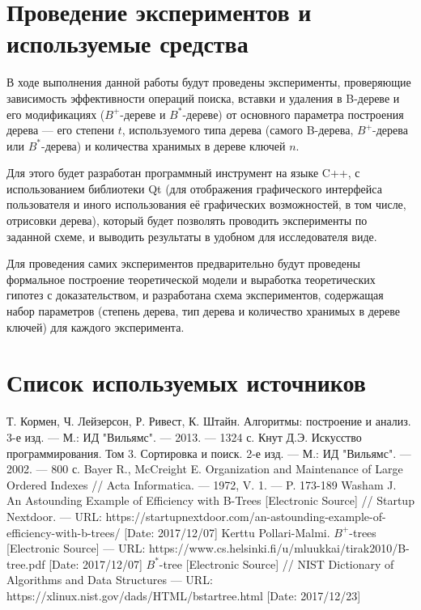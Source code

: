 \documentclass[a4paper,12pt]{article}
\begin{document}
	\section{Проведение экспериментов и используемые средства}
	
	В ходе выполнения данной работы будут проведены эксперименты, проверяющие зависимость эффективности операций поиска, вставки и удаления в B-дереве и его модификациях ($B^+$-дереве и $B^*$-дереве) от основного параметра построения дерева --- его степени $t$, используемого типа дерева (самого B-дерева, $B^+$-дерева или $B^*$-дерева) и количества хранимых в дереве ключей $n$.
	
	Для этого будет разработан программный инструмент на языке C++, с использованием библиотеки Qt (для отображения графического интерфейса пользователя и иного использования её графических возможностей, в том числе, отрисовки дерева), который будет позволять проводить эксперименты по заданной схеме, и выводить результаты в удобном для исследователя виде.
	
	Для проведения самих экспериментов предварительно будут проведены формальное построение теоретической модели и выработка теоретических гипотез с доказательством, и разработана схема экспериментов, содержащая набор параметров (степень дерева, тип дерева и количество хранимых в дереве ключей) для каждого эксперимента.
	
	\section{Список используемых источников}
	
	\begingroup
	\renewcommand{\section}[2]{}
	\begin{thebibliography}{}
		Т. Кормен, Ч. Лейзерсон, Р. Ривест, К. Штайн. Алгоритмы: построение и анализ. 3-е изд. --- М.: ИД "Вильямс". --- 2013. --- 1324 с.
		Кнут Д.Э. Искусство программирования. Том 3. Сортировка и поиск. 2-е изд. --- М.: ИД "Вильямс". --- 2002. --- 800 с.
		Bayer R., McCreight E. Organization and Maintenance of Large Ordered Indexes // Acta Informatica. --- 1972, V. 1. --- P. 173-189
		Washam J. An Astounding Example of Efficiency with B-Trees [Electronic Source] // Startup Nextdoor. --- URL: https://startupnextdoor.com/an-astounding-example-of-efficiency-with-b-trees/ [Date: 2017/12/07]
		Kerttu Pollari-Malmi. $B^+$-trees [Electronic Source] --- URL: https://www.cs.helsinki.fi/u/mluukkai/tirak2010/B-tree.pdf [Date: 2017/12/07]
		$B^*$-tree [Electronic Source] // NIST Dictionary of Algorithms and Data Structures --- URL: https://xlinux.nist.gov/dads/HTML/bstartree.html [Date: 2017/12/23]
	\end{thebibliography}
	
\end{document}

